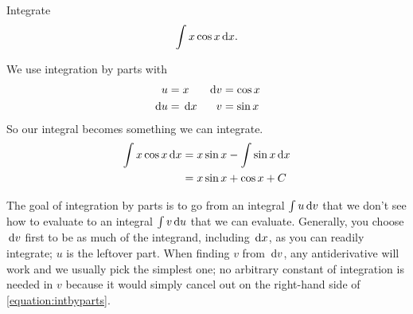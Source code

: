 \begin{ex}
  Integrate
  \[
    \int x \cos x \,\mathrm{d} x.
    \]
    \begin{sol}
      We use integration by parts with
      \begin{align*}
        u&= x & \,\mathrm{d} v &= \cos x \\
        \,\mathrm{d} u &= \,\mathrm{d} x & v &= \sin x
      \end{align*}
      So our integral becomes something we can integrate.
      \begin{align*}
        \int x \cos x \,\mathrm{d} x &= x \sin x - \int \sin x \,\mathrm{d} x \\
        &= x \sin x + \cos x +C
      \end{align*}
    \end{sol}
\end{ex}

The goal of integration by parts is to go from an integral $\int u \,\mathrm{d} v$ that we don't see how to evaluate to an integral $\int v \,\mathrm{d} u$ that we can evaluate.
Generally, you choose $\,\mathrm{d} v$ first to be as much of the integrand, including $\,\mathrm{d} x$, as you can readily integrate; $u$ is the leftover part.
When finding $v$ from $\,\mathrm{d} v$, any antiderivative will work and we usually pick the simplest one; no arbitrary constant of integration is needed in $v$ because it would simply cancel out on the right-hand side of \ref{equation:intbyparts}.

